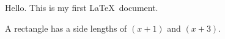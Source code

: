 \documentclass[11pt]{article}
\begin{document}
Hello. This is my first \LaTeX\ document.

A rectangle has a side lengths of $(x + 1)$ and $(x + 3)$.
\end{document}
